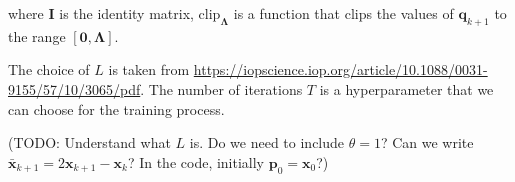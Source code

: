 \documentclass[12pt]{article}
\begin{document}
where $\mathbf{I}$ is the identity matrix, $\text{clip}_{\boldsymbol{\Lambda}}$ is a function that clips the values of $\mathbf{q}_{k+1}$ to the range $[\mathbf{0}, \boldsymbol{\Lambda}]$.

The choice of $L$ is taken from \cite{Sidky_2012} \url{https://iopscience.iop.org/article/10.1088/0031-9155/57/10/3065/pdf}. 
The number of iterations $T$ is a hyperparameter that we can choose for the training process.

(TODO: Understand what $L$ is. Do we need to include $\theta = 1$? Can we write $\bar{\mathbf{x}}_{k+1} = 2 \mathbf{x}_{k+1} - \mathbf{x}_k$? In the code, initially $\mathbf{p}_0 = \mathbf{x}_0$?)










\end{document}
